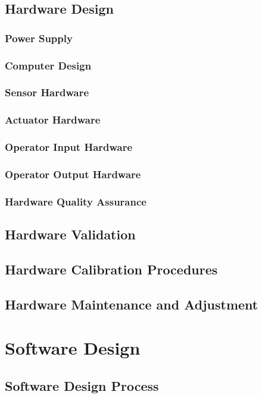 \documentclass[10pt,a4paper]{report}
\begin{document}
\section{Hardware Design}
\subsection{Power Supply}
\subsection{Computer Design}
\subsection{Sensor Hardware}
\subsection{Actuator Hardware}
\subsection{Operator Input Hardware}
\subsection{Operator Output Hardware}
\subsection{Hardware Quality Assurance}

\section{Hardware Validation}

\section{Hardware Calibration Procedures}

\section{Hardware Maintenance and Adjustment}

\chapter{Software Design}
\section{Software Design Process}
\end{document}
